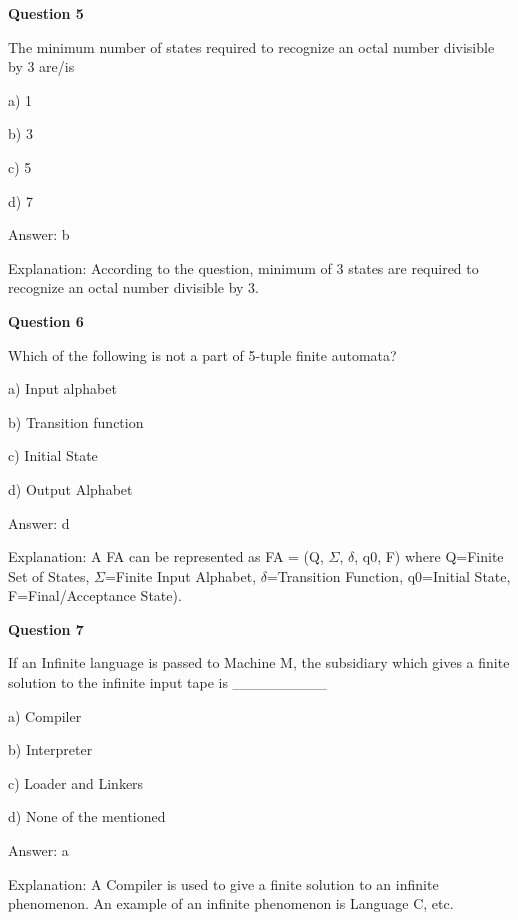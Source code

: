 \documentclass{article}
\begin{document}
\begin{mdframed}[linewidth=1pt, roundcorner=5pt, linecolor=gray!30, backgroundcolor=gray!5]
\textbf{Question 5} 

The minimum number of states required to recognize an octal number divisible by 3 are/is

a) 1

b) 3

c) 5

d) 7
\vspace{5pt} \par
\begin{tcolorbox}[colback=green!5, colframe=green!40!black, title=Solution]
Answer: b

Explanation: According to the question, minimum of 3 states are required to recognize an octal number divisible by 3.
\end{tcolorbox}
\end{mdframed}

\begin{mdframed}[linewidth=1pt, roundcorner=5pt, linecolor=gray!30, backgroundcolor=gray!5]
\textbf{Question 6} 

Which of the following is not a part of 5-tuple finite automata?

a) Input alphabet

b) Transition function

c) Initial State

d) Output Alphabet
\vspace{5pt} \par
\begin{tcolorbox}[colback=green!5, colframe=green!40!black, title=Solution]
Answer: d

Explanation: A FA can be represented as FA = (Q, $\Sigma$, $\delta$, q0, F) where Q=Finite Set of States, $\Sigma$=Finite Input Alphabet, $\delta$=Transition Function, q0=Initial State, F=Final/Acceptance State).
\end{tcolorbox}
\end{mdframed}
\newpage

\begin{mdframed}[linewidth=1pt, roundcorner=5pt, linecolor=gray!30, backgroundcolor=gray!5]
\textbf{Question 7} 

If an Infinite language is passed to Machine M, the subsidiary which gives a finite solution to the infinite input tape is \_\_\_\_\_\_\_\_\_

a) Compiler

b) Interpreter

c) Loader and Linkers

d) None of the mentioned
\vspace{5pt} \par
\begin{tcolorbox}[colback=green!5, colframe=green!40!black, title=Solution]
Answer: a

Explanation: A Compiler is used to give a finite solution to an infinite phenomenon. An example of an infinite phenomenon is Language C, etc.
\end{tcolorbox}
\end{mdframed}
\end{document}
